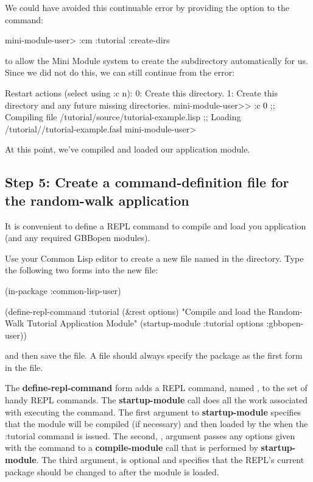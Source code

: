 \documentclass[10pt,twoside,english,pdftex]{article}
\begin{document}
We could have avoided this continuable error by providing the
 option to the  command:
%
\W\supp
\begin{example}
\textcolor{darkergray}{%
  mini-module-user> :cm :tutorial :create-dirs}
\end{example}
%
to allow the Mini Module system to create the 
subdirectory automatically for us.  Since we did not do this, we can still
continue from the error:
%
\W\supp\notpretop
\begin{example}
\textcolor{darkergray}{%
  Restart actions (select using :c n):
    0: Create this directory.
    1: Create this directory and any future missing directories.
  mini-module-user>> \textcolor{black}{:c 0}
  ;; Compiling file /tutorial/source/tutorial-example.lisp
  ;; Loading /tutorial//tutorial-example.fasl
  mini-module-user>}
\end{example}

At this point, we've compiled and loaded our  application
module.

\subsection*{Step 5: Create a command-definition file for the random-walk
  application}

It is convenient to define a REPL command to compile and load you application
(and any required GBBopen modules).  

Use your Common Lisp editor to create a new file named  in
the  directory. Type the following two forms into the new
 file:
%
%
%
\W\supp
\begin{example}
(in-package :common-lisp-user)

(define-repl-command :tutorial (\&rest options)
  "Compile and load the Random-Walk Tutorial Application Module"
  (startup-module :tutorial options :gbbopen-user))
\end{example}
%
and then save the file.  A  file should always specify the
 package as the first form in the file.

The \textbf{define-repl-command} form adds a REPL command, named
, to the set of handy REPL commands.  The
\textbf{startup-module} call does all the work associated with executing the
command.  The first argument to \textbf{startup-module} specifies that the
 module will be compiled (if necessary) and then loaded by the
 when the \code:{tutorial}
command is issued.  The second, , argument passes any options
given with the command to a \textbf{compile-module} call that is performed by
\textbf{startup-module}.  The third argument,  is optional
and specifies that the REPL's current package should be changed to
 after the  module is loaded.
\end{document}
